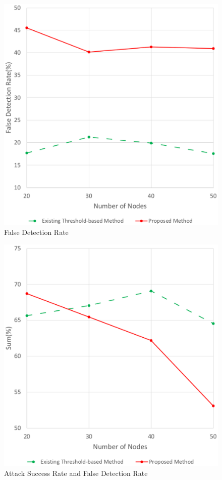 \documentclass[conference]{IEEEtran}
\begin{document}
\begin{figure}[!htb]
\centering
\includegraphics [scale=0.45]{FDR}
\caption{False Detection Rate}
\label{fig:falsePositive}
\end{figure}

\begin{figure}[!htb]
\centering
\includegraphics[scale=0.45]{ASRFDR}
\caption{Attack Success Rate and False Detection Rate}
\label{fig:SuccessAndFalse}
\end{figure}
\end{document}
